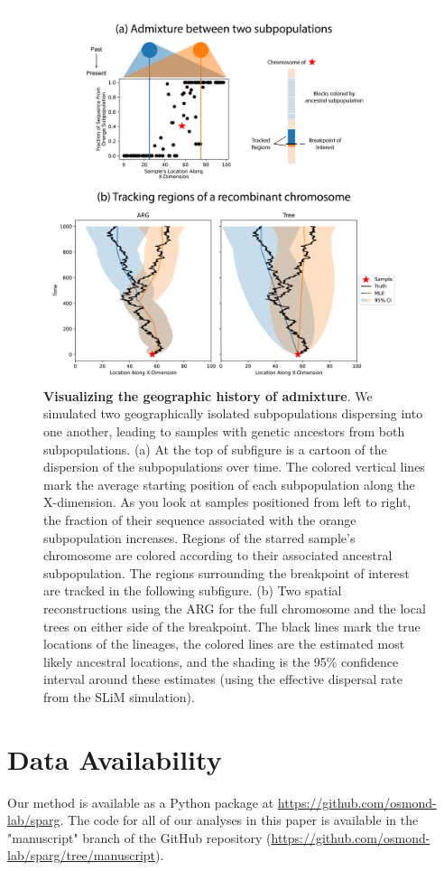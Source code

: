 \begin{figure}
    \centering
    \includegraphics[width=400px]{Images/Figure7_TwoPop/Fig7_Complete_V2.png}
    \caption{\textbf{Visualizing the geographic history of admixture}. We simulated two geographically isolated subpopulations dispersing into one another, leading to samples with genetic ancestors from both subpopulations. (a) At the top of subfigure is a cartoon of the dispersion of the subpopulations over time. The colored vertical lines mark the average starting position of each subpopulation along the X-dimension. As you look at samples positioned from left to right, the fraction of their sequence associated with the orange subpopulation increases. Regions of the starred sample's chromosome are colored according to their associated ancestral subpopulation. The regions surrounding the breakpoint of interest are tracked in the following subfigure. (b) Two spatial reconstructions using the ARG for the full chromosome and the local trees on either side of the breakpoint. The black lines mark the true locations of the lineages, the colored lines are the estimated most likely ancestral locations, and the shading is the 95\% confidence interval around these estimates (using the effective dispersal rate from the SLiM simulation).
    }
    \label{fig:tracking_recomb_sample}
\end{figure}


\section{Data Availability}

Our method is available as a Python package at \url{https://github.com/osmond-lab/sparg}. The code for all of our analyses in this paper is available in the "manuscript" branch of the GitHub repository (\url{https://github.com/osmond-lab/sparg/tree/manuscript}).



\newpage



